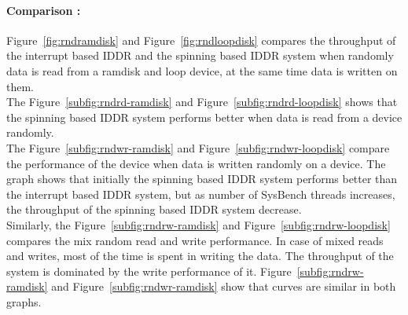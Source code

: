 \paragraph{Comparison :}

Figure~\ref{fig:rndramdisk} and Figure~\ref{fig:rndloopdisk} compares the throughput of the interrupt based IDDR and the spinning based IDDR system when randomly data is read from a ramdisk and loop device, at the same time data is written on them.
\\[3mm]
The Figure~\ref{subfig:rndrd-ramdisk} and Figure~\ref{subfig:rndrd-loopdisk} shows that the spinning based IDDR system performs better when data is read from a device randomly.  
\\[3mm]
The Figure~\ref{subfig:rndwr-ramdisk} and Figure~\ref{subfig:rndwr-loopdisk} compare the performance of the device when data is written randomly on a device. The graph shows that initially the spinning based IDDR system performs better than the interrupt based IDDR system, but as number of SysBench threads increases, the throughput of the spinning based IDDR system decrease.
\\[3mm] 
Similarly, the Figure~\ref{subfig:rndrw-ramdisk} and Figure~\ref{subfig:rndrw-loopdisk} compares the mix random read and write performance. In case of mixed reads and writes, most of the time is spent in writing the data. The throughput of the system is dominated by the write performance of it. Figure~\ref{subfig:rndrw-ramdisk} and Figure~\ref{subfig:rndwr-ramdisk} show that curves are similar in both graphs. 

